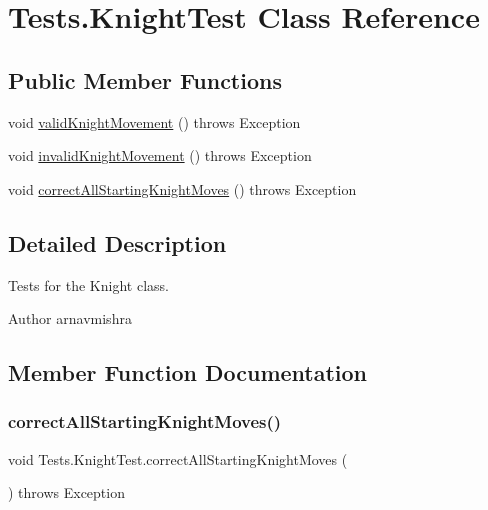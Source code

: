 \hypertarget{class_tests_1_1_knight_test}{}\section{Tests.\+Knight\+Test Class Reference}
\label{class_tests_1_1_knight_test}
\subsection*{Public Member Functions}
\begin{DoxyCompactItemize}
\item 
void \hyperlink{class_tests_1_1_knight_test_aeef4aecba7d22407c8945dabf02ae3fa}{valid\+Knight\+Movement} ()  throws Exception 
\item 
void \hyperlink{class_tests_1_1_knight_test_a2055e2c815f2c80d89a9f9519702b712}{invalid\+Knight\+Movement} ()  throws Exception 
\item 
void \hyperlink{class_tests_1_1_knight_test_a1f2b34d555e7c732d14245368341ee02}{correct\+All\+Starting\+Knight\+Moves} ()  throws Exception 
\end{DoxyCompactItemize}


\subsection{Detailed Description}
Tests for the Knight class. \begin{DoxyAuthor}{Author}
arnavmishra 
\end{DoxyAuthor}


\subsection{Member Function Documentation}
\hypertarget{class_tests_1_1_knight_test_a1f2b34d555e7c732d14245368341ee02}{}\label{class_tests_1_1_knight_test_a1f2b34d555e7c732d14245368341ee02} 
\subsubsection{\texorpdfstring{correct\+All\+Starting\+Knight\+Moves()}{correctAllStartingKnightMoves()}}
{\footnotesize\ttfamily void Tests.\+Knight\+Test.\+correct\+All\+Starting\+Knight\+Moves (\begin{DoxyParamCaption}{ }\end{DoxyParamCaption}) throws Exception}

